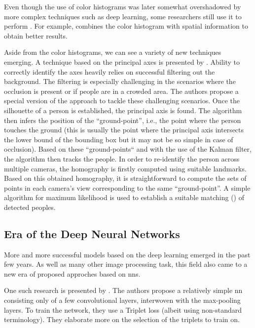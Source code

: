 Even though the use of color histograms was later somewhat overshadowed by more complex techniques such as deep learning, some researchers still use it to perform \reid{}. For example, \cite{zeng2014person} combines the color histogram with spatial information to obtain better results.

Aside from the color histograms, we can see a variety of new techniques emerging. A technique based on the principal axes is presented by \cite{hu2006principal}. Ability to correctly identify the axes heavily relies on successful filtering out the background. The filtering is especially challenging in the scenarios where the occlusion is present or if people are in a crowded area. The authors propose a special version of the approach to tackle these challenging scenarios. Once the silhouette of a person is established, the principal axis is found. The algorithm then infers the position of the ``ground-point'', i.e., the point where the person touches the ground (this is usually the point where the principal axis intersects the lower bound of the bounding box but it may not be so simple in case of occlusion). Based on these ``ground-points`` and with the use of the Kalman filter, the algorithm then tracks the people. In order to re-identify the person across multiple cameras, the homography is firstly computed using suitable landmarks. Based on this obtained homography, it is straightforward to compute the sets of points in each camera's view corresponding to the same ``ground-point''. A simple algorithm for maximum likelihood is used to establish a suitable matching (\reid{}) of detected peoples.

\subsection{Era of the Deep Neural Networks}

More and more successful models based on the deep learning emerged in the past few years. As well as many other image processing task, this field also came to a new era of proposed approches based on \glspl{nn}.

One such research is presented by \cite{ding2015deep}. The authors propose a relatively simple \gls{nn} consisting only of a few convolutional layers, interwoven with the max-pooling layers. To train the network, they use a Triplet loss (albeit using non-standard terminology). They elaborate more on the selection of the triplets to train on.


